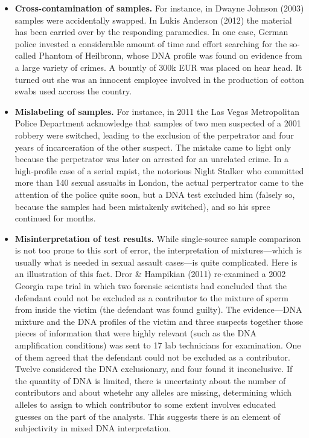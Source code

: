 \documentclass[
  10pt,
  dvipsnames,enabledeprecatedfontcommands]{scrartcl}
\begin{document}
\begin{itemize}
\item
  \textbf{Cross-contamination of samples.} For instance, in Dwayne
  Johnson (2003) samples were accidentally swapped. In Lukis Anderson
  (2012) the material has been carried over by the responding
  paramedics. In one case, German police invested a considerable amount
  of time and effort searching for the so-called Phantom of Heilbronn,
  whose DNA profile was found on evidence from a large variety of
  crimes. A bountly of 300k EUR was placed on hear head. It turned out
  she was an innocent employee involved in the production of cotton
  swabs used accross the country.
\item
  \textbf{Mislabeling of samples.} For instance, in 2011 the Las Vegas
  Metropolitan Police Department acknowledge that samples of two men
  suspected of a 2001 robbery were switched, leading to the exclusion of
  the perpetrator and four years of incarceration of the other suspect.
  The mistake came to light only because the perpetrator was later on
  arrested for an unrelated crime. In a high-profile case of a serial
  rapist, the notorious Night Stalker who committed more than 140 sexual
  assualts in London, the actual perpertrator came to the attention of
  the police quite soon, but a DNA test excluded him (falsely so,
  because the samples had been mistakenly switched), and so his spree
  continued for months.
\item
  \textbf{Misinterpretation of test results.} While single-source sample
  comparison is not too prone to this sort of error, the interpretation
  of mixtures---which is usually what is needed in sexual assault
  cases---is quite complicated. Here is an illustration of this fact.
  Dror \& Hampikian (2011) re-examined a 2002 Georgia rape trial in
  which two forensic scientists had concluded that the defendant could
  not be excluded as a contributor to the mixture of sperm from inside
  the victim (the defendant was found guilty). The evidence---DNA
  mixture and the DNA profiles of the victim and three suspects together
  those pieces of information that were highly relevant (such as the DNA
  amplification conditions) was sent to 17 lab technicians for
  examination. One of them agreed that the defendant could not be
  excluded as a contributor. Twelve considered the DNA exclusionary, and
  four found it inconclusive. If the quantity of DNA is limited, there
  is uncertainty about the number of contributors and about whetehr any
  alleles are missing, determining which alleles to assign to which
  contributor to some extent involves educated guesses on the part of
  the analysts. This suggests there is an element of subjectivity in
  mixed DNA interpretation.
\end{itemize}
\end{document}
